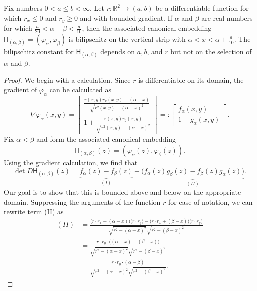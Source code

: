 \documentclass[10pt,a4paper]{amsart}
\begin{document}
\begin{lemma} \label{lemma:circles_canonical_embedding}
    Fix numbers $0 < a \le b < \infty$. Let $r : \mathbb{R}^2 \to (a, b)$ be a differentiable function for which $r_x \le 0$ and $r_y \ge 0$ and with bounded gradient. If $\alpha$ and $\beta$ are real numbers for which $\frac{a}{20} < \alpha - \beta < \frac{a}{10}$, then the associated canonical embedding $\mathsf{H}_{(\alpha, \beta)} = (\varphi_{\alpha}, \varphi_{\beta})$ is bilipschitz on the vertical strip with $\alpha < x < \alpha + \frac a {10}.$ The bilipschitz constant for $\mathsf{H}_{(\alpha, \beta)}$ depends on $a, b$, and $r$ but not on the selection of $\alpha$ and $\beta$.
\end{lemma}

\begin{proof}
    We begin with a calculation. Since $r$ is differentiable on its domain, the gradient of $\varphi_{\alpha}$ can be calculated as
    $$\nabla \varphi_{\alpha}(x, y) = \begin{bmatrix} \frac{r(x, y) r_x(x, y) + (\alpha - x)}{\sqrt{r^2(x, y) - (\alpha - x)^2}} \\ 1 + \frac{r(x, y) r_y(x, y)}{\sqrt{r^2(x, y) - (\alpha - x)^2}}\end{bmatrix} =: \begin{bmatrix} f_{\alpha}(x, y) \\ 1 + g_{\alpha}(x, y)\end{bmatrix}.$$
    Fix $\alpha < \beta$ and form the associated canonical embedding
    $$\mathsf{H}_{(\alpha, \beta)}(z) = (\varphi_{\alpha}(z), \varphi_{\beta}(z)).$$
    Using the gradient calculation, we find that
    $$\det D\mathsf{H}_{(\alpha, \beta)}(z) = \underbrace{f_{\alpha}(z) - f_{\beta}(z)}_{(I)} + \underbrace{\big(f_{\alpha}(z) g_{\beta}(z) - f_{\beta}(z) g_{\alpha}(z)\big)}_{(II)}.$$
    Our goal is to show that this is bounded above and below on the appropriate domain. Suppressing the arguments of the function $r$ for ease of notation, we can rewrite term (II) as 
    \begin{align*}
        (II) &= \frac{\big(r \cdot r_x + (\alpha - x)\big)\big(r\cdot r_y\big) - \big(r \cdot r_x + (\beta - x)\big)\big(r\cdot r_y\big)}{\sqrt{r^2 - (\alpha - x)^2}\sqrt{r^2 - (\beta - x)^2}} \\
        &= \frac{r \cdot r_y \cdot \big((\alpha - x) - (\beta - x)\big)}{\sqrt{r^2 - (\alpha - x)^2}\sqrt{r^2 - (\beta - x)^2}} \\
        &= \frac{r \cdot r_y \cdot (\alpha - \beta)}{\sqrt{r^2 - (\alpha - x)^2}\sqrt{r^2 - (\beta - x)^2}}.

\end{align*}
\end{proof}
\end{document}
